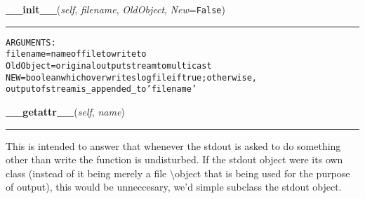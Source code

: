     \vspace{0.5ex}

\hspace{.8\funcindent}\begin{boxedminipage}{\funcwidth}

    \raggedright \textbf{\_\_init\_\_}(\textit{self}, \textit{filename}, \textit{OldObject}, \textit{New}={\tt False})

    \vspace{-1.5ex}

    \rule{\textwidth}{0.5\fboxrule}
\setlength{\parskip}{2ex}
\begin{alltt}

ARGUMENTS:
        filename = name of file to write to 
        OldObject = original output stream to multicast
        NEW = boolean which overwrites log file if true; otherwise, 
        output of stream is \_appended\_ to 'filename'    
        
\end{alltt}

\setlength{\parskip}{1ex}
    \end{boxedminipage}

    \label{System:Utils:multicaster:__getattr__}

    \vspace{0.5ex}

\hspace{.8\funcindent}\begin{boxedminipage}{\funcwidth}

    \raggedright \textbf{\_\_getattr\_\_}(\textit{self}, \textit{name})

    \vspace{-1.5ex}

    \rule{\textwidth}{0.5\fboxrule}
\setlength{\parskip}{2ex}
    This is intended to answer that whenever the stdout is asked to do 
    something other than write the  function is undisturbed.  If the stdout
    object were its own class (instead of it being merely a file 
    {\textbackslash}object that is being used for the purpose of output), 
    this would be unneccesary, we'd simple subclass the stdout object.

\setlength{\parskip}{1ex}
    \end{boxedminipage}

    \label{System:Utils:multicaster:write}

